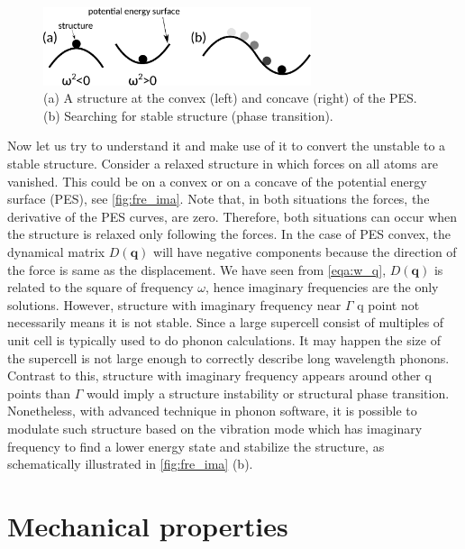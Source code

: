 \begin{figure}[htbp!] 
\centering  
\includegraphics[width=0.7\textwidth]{fre_ima.eps}
\caption{ (a) A structure at the convex (left) and concave (right) of the PES. (b) Searching for stable structure (phase transition).}  
\label{fig:fre_ima}
\end{figure} 

Now let us try to understand it and make use of it to convert the unstable to a stable structure. Consider a relaxed structure in which forces on all atoms are vanished. This could be on a convex or on a concave of the potential energy surface (PES), see \autoref{fig:fre_ima}. Note that, in both situations the forces, the derivative of the PES curves, are zero. Therefore, both situations can occur when the structure is relaxed only following the forces. In the case of PES convex, the dynamical matrix $D(\mathbf{q})$ will have negative components because the direction of the force is same as the displacement. We have seen from \autoref{eqa:w_q}, $D(\mathbf{q})$ is related to the square of frequency $\omega$, hence imaginary frequencies are the only solutions. However, structure with imaginary frequency near $\Gamma$ q point not necessarily means it is not stable. Since a large supercell consist of multiples of unit cell is typically used to do phonon calculations. It may happen the size of the supercell is not large enough to correctly describe long wavelength phonons. Contrast to this, structure with imaginary frequency appears around other q points than $\Gamma$ would imply a structure instability or structural phase transition. Nonetheless, with advanced technique in phonon software\cite{Togo20151}, it is possible to modulate such structure based on the vibration mode which has imaginary frequency to find a lower energy state and stabilize the structure, as schematically illustrated in \autoref{fig:fre_ima} (b). 



\section{Mechanical properties}

